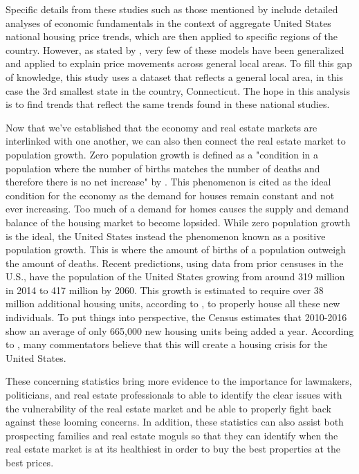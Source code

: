 \documentclass[12pt]{article}
\begin{document}
Specific details from these studies such as those mentioned by \citep{Quigley} include detailed analyses of economic fundamentals in the context of aggregate United States national housing price trends, which are then applied to specific regions of the country. However, as stated by \citep{Quigley}, very few of these models have been generalized and applied to explain price movements across general local areas. To fill this gap of knowledge, this study uses a dataset that reflects a general local area, in this case the 3rd smallest state in the country, Connecticut. The hope in this analysis is to find trends that reflect the same trends found in these national studies.

Now that we've established that the economy and real estate markets are interlinked with one another, we can also then connect the real estate market to population growth. Zero population growth is defined as a "condition in a population where the number of births matches the number of deaths and therefore there is no net increase" by \citep{Robbins}. This phenomenon is cited as the ideal condition for the economy as the demand for houses remain constant and not ever increasing. Too much of a demand for homes causes the supply and demand balance of the housing market to become lopsided. While zero population growth is the ideal, the United States instead the phenomenon known as a positive population growth. This is where the amount of births of a population outweigh the amount of deaths. Recent predictions, using data from prior censuses in the U.S., have the population of the United States growing from around 319 million in 2014 to 417 million by 2060. This growth is estimated to require over 38 million additional housing units, according to \citep{saiz2017real}, to properly house all these new individuals. To put things into perspective, the Census estimates that 2010-2016 show an average of only 665,000 new housing units being added a year. According to \citep{Williams}, many commentators believe that this will create a housing crisis for the United States.

These concerning statistics bring more evidence to the importance for lawmakers, politicians, and real estate professionals to able to identify the clear issues with the vulnerability of the real estate market and be able to properly fight back against these looming concerns. In addition, these statistics can also assist both prospecting families and real estate moguls so that they can identify when the real estate market is at its healthiest in order to buy the best properties at the best prices.
\end{document}

